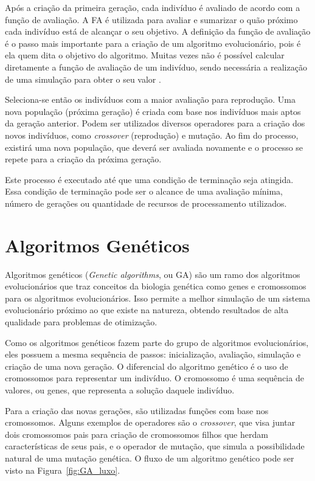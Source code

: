 \documentclass[12pt,oneside,a4paper,english,french,spanish,brazil,]{abntex2}
\begin{document}
Após a criação da primeira geração, cada indivíduo é avaliado de acordo com a função de avaliação. A FA é utilizada para avaliar e sumarizar o quão próximo cada indivíduo está de alcançar o seu objetivo. A definição da função de avaliação é o passo mais importante para a criação de um algoritmo evolucionário, pois é ela quem dita o objetivo do algoritmo. Muitas vezes não é possível calcular diretamente a função de avaliação de um indivíduo, sendo necessária a realização de uma simulação para obter o seu valor \cite{linden:2008}.

Seleciona-se então os indivíduos com a maior avaliação para reprodução. Uma nova população (próxima geração) é criada com base nos indivíduos mais aptos da geração anterior. Podem ser utilizados diversos operadores para a criação dos novos indivíduos, como \textit{crossover} (reprodução) e mutação. Ao fim do processo, existirá uma nova população, que deverá ser avaliada novamente e o processo se repete para a criação da próxima geração.

Este processo é executado até que uma condição de terminação seja atingida. Essa condição de terminação pode ser o alcance de uma avaliação mínima, número de gerações ou quantidade de recursos de processamento utilizados.

\section{Algoritmos Genéticos}

Algoritmos genéticos (\textit{Genetic algorithms}, ou GA) são um ramo dos algoritmos evolucionários que traz conceitos da biologia genética como genes e cromossomos para os algoritmos evolucionários. Isso permite a melhor simulação de um sistema evolucionário próximo ao que existe na natureza, obtendo resultados de alta qualidade para problemas de otimização.

Como os algoritmos genéticos fazem parte do grupo de algoritmos evolucionários, eles possuem a mesma sequência de passos: inicialização, avaliação, simulação e criação de uma nova geração. O diferencial do algoritmo genético é o uso de cromossomos para representar um indivíduo. O cromossomo é uma sequência de valores, ou genes, que representa a solução daquele indivíduo.

Para a criação das novas gerações, são utilizadas funções com base nos cromossomos. Alguns exemplos de operadores são o \textit{crossover}, que visa juntar dois cromossomos pais para criação de cromossomos filhos que herdam características de seus pais, e o operador de mutação, que simula a possibilidade natural de uma mutação genética. O fluxo de um algoritmo genético pode ser visto na Figura~\ref{fig:GA_luxo}.
\end{document}
